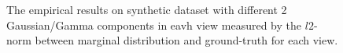 \documentclass[11pt]{article}
\begin{document}
\begin{figure}
\caption{The empirical results on synthetic dataset with different 2 Gaussian/Gamma components in eavh view measured by the $l2$-norm between marginal distribution and ground-truth for each view.}
\end{figure}
\end{document}

